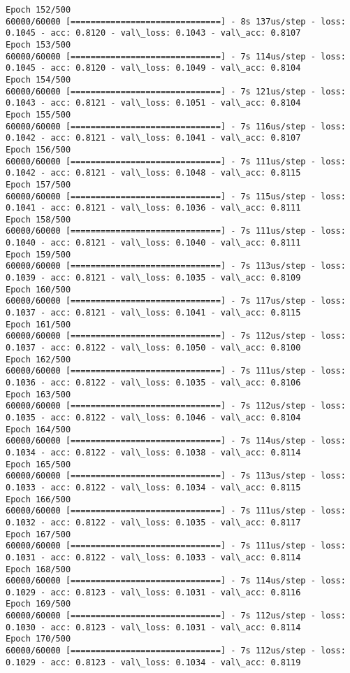 \documentclass[11pt]{article}
\begin{document}
\begin{Verbatim}[commandchars=\\\{\}]
Epoch 152/500
60000/60000 [==============================] - 8s 137us/step - loss: 0.1045 - acc: 0.8120 - val\_loss: 0.1043 - val\_acc: 0.8107
Epoch 153/500
60000/60000 [==============================] - 7s 114us/step - loss: 0.1045 - acc: 0.8120 - val\_loss: 0.1049 - val\_acc: 0.8104
Epoch 154/500
60000/60000 [==============================] - 7s 121us/step - loss: 0.1043 - acc: 0.8121 - val\_loss: 0.1051 - val\_acc: 0.8104
Epoch 155/500
60000/60000 [==============================] - 7s 116us/step - loss: 0.1042 - acc: 0.8121 - val\_loss: 0.1041 - val\_acc: 0.8107
Epoch 156/500
60000/60000 [==============================] - 7s 111us/step - loss: 0.1042 - acc: 0.8121 - val\_loss: 0.1048 - val\_acc: 0.8115
Epoch 157/500
60000/60000 [==============================] - 7s 115us/step - loss: 0.1041 - acc: 0.8121 - val\_loss: 0.1036 - val\_acc: 0.8111
Epoch 158/500
60000/60000 [==============================] - 7s 111us/step - loss: 0.1040 - acc: 0.8121 - val\_loss: 0.1040 - val\_acc: 0.8111
Epoch 159/500
60000/60000 [==============================] - 7s 113us/step - loss: 0.1039 - acc: 0.8121 - val\_loss: 0.1035 - val\_acc: 0.8109
Epoch 160/500
60000/60000 [==============================] - 7s 117us/step - loss: 0.1037 - acc: 0.8121 - val\_loss: 0.1041 - val\_acc: 0.8115
Epoch 161/500
60000/60000 [==============================] - 7s 112us/step - loss: 0.1037 - acc: 0.8122 - val\_loss: 0.1050 - val\_acc: 0.8100
Epoch 162/500
60000/60000 [==============================] - 7s 111us/step - loss: 0.1036 - acc: 0.8122 - val\_loss: 0.1035 - val\_acc: 0.8106
Epoch 163/500
60000/60000 [==============================] - 7s 112us/step - loss: 0.1035 - acc: 0.8122 - val\_loss: 0.1046 - val\_acc: 0.8104
Epoch 164/500
60000/60000 [==============================] - 7s 114us/step - loss: 0.1034 - acc: 0.8122 - val\_loss: 0.1038 - val\_acc: 0.8114
Epoch 165/500
60000/60000 [==============================] - 7s 113us/step - loss: 0.1033 - acc: 0.8122 - val\_loss: 0.1034 - val\_acc: 0.8115
Epoch 166/500
60000/60000 [==============================] - 7s 111us/step - loss: 0.1032 - acc: 0.8122 - val\_loss: 0.1035 - val\_acc: 0.8117
Epoch 167/500
60000/60000 [==============================] - 7s 111us/step - loss: 0.1031 - acc: 0.8122 - val\_loss: 0.1033 - val\_acc: 0.8114
Epoch 168/500
60000/60000 [==============================] - 7s 114us/step - loss: 0.1029 - acc: 0.8123 - val\_loss: 0.1031 - val\_acc: 0.8116
Epoch 169/500
60000/60000 [==============================] - 7s 112us/step - loss: 0.1030 - acc: 0.8123 - val\_loss: 0.1031 - val\_acc: 0.8114
Epoch 170/500
60000/60000 [==============================] - 7s 112us/step - loss: 0.1029 - acc: 0.8123 - val\_loss: 0.1034 - val\_acc: 0.8119

\end{Verbatim}
\end{document}
